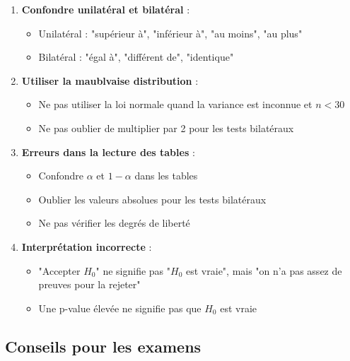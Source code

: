 \documentclass[11pt,a4paper]{article}
\begin{document}
\begin{enumerate}
    \item \textbf{Confondre unilatéral et bilatéral} :
    \begin{itemize}
        \item Unilatéral : "supérieur à", "inférieur à", "au moins", "au plus"
        \item Bilatéral : "égal à", "différent de", "identique"
    \end{itemize}
    
    \item \textbf{Utiliser la maublvaise distribution} :
    \begin{itemize}
        \item Ne pas utiliser la loi normale quand la variance est inconnue et $n < 30$
        \item Ne pas oublier de multiplier par 2 pour les tests bilatéraux
    \end{itemize}
    
    \item \textbf{Erreurs dans la lecture des tables} :
    \begin{itemize}
        \item Confondre $\alpha$ et $1-\alpha$ dans les tables
        \item Oublier les valeurs absolues pour les tests bilatéraux
        \item Ne pas vérifier les degrés de liberté
    \end{itemize}
    
    \item \textbf{Interprétation incorrecte} :
    \begin{itemize}
        \item "Accepter $H_0$" ne signifie pas "$H_0$ est vraie", mais "on n'a pas assez de preuves pour la rejeter"
        \item Une p-value élevée ne signifie pas que $H_0$ est vraie
    \end{itemize}
\end{enumerate}

\subsection{Conseils pour les examens}
\end{document}
